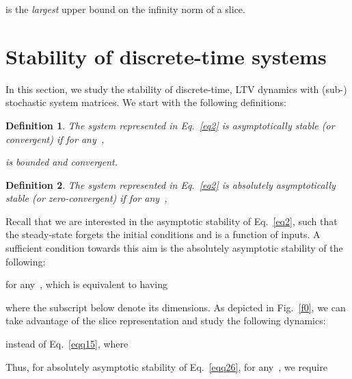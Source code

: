 \documentclass[draftclsnofoot, onecolumn, 12pt]{IEEEtran}
\newtheorem{definition}{Definition}
\begin{document}
is the \textit{largest} upper bound on the infinity norm of a slice.

\section{Stability of discrete-time  systems}\label{stability}
In this section, we study the stability of discrete-time, LTV dynamics with (sub-) stochastic system matrices. We start with the following definitions:
\begin{definition}
The system represented in Eq.~\eqref{eq2} is \textit{asymptotically stable} (or convergent) if for any~,

is bounded and convergent.
\end{definition}

\begin{definition}
The system represented in Eq.~\eqref{eq2} is \textit{absolutely asymptotically stable} (or zero-convergent) if for any~, 

\end{definition}

Recall that we are interested in the asymptotic stability of Eq.~\eqref{eq2}, such that the steady-state forgets the initial conditions and is a function of inputs. A sufficient condition towards this aim is the absolutely asymptotic stability of the following:

for any~, which is equivalent to having 

where the subscript below  denote its dimensions. As depicted in Fig.~\ref{f0}, we can take advantage of the slice representation and study the following dynamics:

instead of Eq.~\eqref{eqq15}, where

Thus, for absolutely asymptotic stability of Eq.~\eqref{eqq26}, for any~, we require
\end{document}
